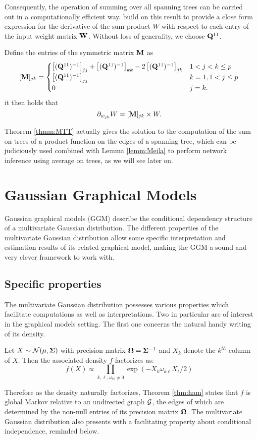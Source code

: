 Consequently, the operation of summing over all spanning trees can be carried out in a computationally efficient way. \cite{MeilaJaak}  build on this result to provide a close form expression for the derivative of the sum-product $W$ with respect to each entry of the input weight matrix ${\bf W}$.   Without loss of generality, we choose ${\bf Q}^{11}$.

\begin{lemma}  \label{lemm:Meila}
    Define the entries of the symmetric matrix ${\bf M}$ as
\[    
 [{\bf M}]_{jk} =\begin{cases}
    \left[({\bf Q}^{11})^{-1}\right]_{jj} + \left[({\bf Q}^{11})^{-1}\right]_{kk} -2\left[({\bf Q}^{11})^{-1}\right]_{jk} & 1< j<k \leq p\\
    \left[({\bf Q}^{11})^{-1}\right]_{jj} & k=1, 1< j \leq p  \\
    0 &  j=k .
    \end{cases}
\] 
it then holds that
$$\partial_{w_{jk}} W = [{\bf M}]_{jk}  \times W.$$
\end{lemma}

Theorem \ref{thmm:MTT} actually gives the solution to the computation of the sum on trees of a product function on the edges of a spanning tree, which can be judiciously used combined with  Lemma \ref{lemm:Meila} to perform network inference using average on trees, as we will see later on. 

 \section{Gaussian Graphical Models}
 Gaussian graphical models (GGM) describe the conditional dependency structure of a  multivariate Gaussian distribution. The different properties of the multivariate Gaussian distribution allow some specific interpretation and estimation results of its related graphical model,  making the GGM a sound and very clever framework to work with.
 
 \subsection{Specific properties}
The multivariate Gaussian distribution possesses various properties which facilitate computations as well as interpretations. Two in particular are of interest in the graphical models setting. The first one concerns the natural handy writing of its density.
 \begin{prop}\label{pp:ggm1}
 Let $X\sim \mathcal{N}(\mu, {\boldsymbol{\Sigma}})$ with precision matrix ${\boldsymbol{\Omega}}={\boldsymbol{\Sigma}}^{-1}$ and $X_k$ denote the $k^{th}$ column of $X$. Then the associated density $f$ factorizes as:
 $$f(X) \propto \prod_{k,\ell, \omega_{kl}\neq 0} \exp(-X_{k}\omega_{k\ell}X_{\ell}/2)$$
 \end{prop}
 Therefore as the density naturally factorizes, Theorem \ref{thm:ham} states that $f$ is global Markov relative to an undirected graph $\mathcal{G}$, the edges of which are determined by the non-null entries of its precision matrix ${\boldsymbol{\Omega}}$.  The multivariate Gaussian distribution also presents with a facilitating property about conditional independence, reminded below.
 
